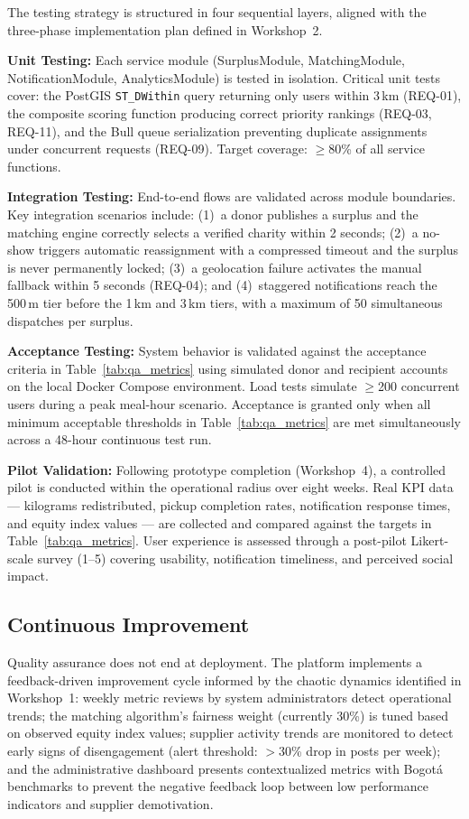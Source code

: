 \documentclass[conference]{IEEEtran}
\begin{document}
The testing strategy is structured in four sequential layers, aligned with the three-phase implementation plan defined in Workshop~2.

\textbf{Unit Testing:} Each service module (SurplusModule, MatchingModule, NotificationModule, AnalyticsModule) is tested in isolation. Critical unit tests cover: the PostGIS \texttt{ST\_DWithin} query returning only users within 3\,km (REQ-01), the composite scoring function producing correct priority rankings (REQ-03, REQ-11), and the Bull queue serialization preventing duplicate assignments under concurrent requests (REQ-09). Target coverage: $\geq$80\% of all service functions.

\textbf{Integration Testing:} End-to-end flows are validated across module boundaries. Key integration scenarios include: (1)~a donor publishes a surplus and the matching engine correctly selects a verified charity within 2 seconds; (2)~a no-show triggers automatic reassignment with a compressed timeout and the surplus is never permanently locked; (3)~a geolocation failure activates the manual fallback within 5 seconds (REQ-04); and (4)~staggered notifications reach the 500\,m tier before the 1\,km and 3\,km tiers, with a maximum of 50 simultaneous dispatches per surplus.

\textbf{Acceptance Testing:} System behavior is validated against the acceptance criteria in Table~\ref{tab:qa_metrics} using simulated donor and recipient accounts on the local Docker Compose environment. Load tests simulate $\geq$200 concurrent users during a peak meal-hour scenario. Acceptance is granted only when all minimum acceptable thresholds in Table~\ref{tab:qa_metrics} are met simultaneously across a 48-hour continuous test run.

\textbf{Pilot Validation:} Following prototype completion (Workshop~4), a controlled pilot is conducted within the operational radius over eight weeks. Real KPI data --- kilograms redistributed, pickup completion rates, notification response times, and equity index values --- are collected and compared against the targets in Table~\ref{tab:qa_metrics}. User experience is assessed through a post-pilot Likert-scale survey (1--5) covering usability, notification timeliness, and perceived social impact.

\subsection{Continuous Improvement}

Quality assurance does not end at deployment. The platform implements a feedback-driven improvement cycle informed by the chaotic dynamics identified in Workshop~1: weekly metric reviews by system administrators detect operational trends; the matching algorithm's fairness weight (currently 30\%) is tuned based on observed equity index values; supplier activity trends are monitored to detect early signs of disengagement (alert threshold: $>$30\% drop in posts per week); and the administrative dashboard presents contextualized metrics with Bogotá benchmarks to prevent the negative feedback loop between low performance indicators and supplier demotivation.
\end{document}
